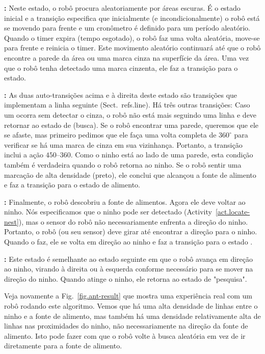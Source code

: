 \noindent\textbf{:} Neste estado, o robô procura aleatoriamente por áreas escuras. É o estado inicial e a transição  especifica que inicialmente (e incondicionalmente) o robô está se movendo para frente e um cronômetro é definido para um período aleatório. Quando o timer expira (tempo esgotado), o robô faz uma volta aleatória, move-se para frente e reinicia o timer. Este movimento aleatório continuará até que o robô encontre a parede da área ou uma marca cinza na superfície da área.  Uma vez que o robô tenha detectado uma marca cinzenta, ele faz a transição para o estado.

\smallskip

\noindent\textbf{:} As duas auto-transições acima e à direita deste estado são transições que implementam a linha seguinte (Sect.~ref{s.line}). Há três outras transições: Caso um  ocorra sem detectar o cinza, o robô não está mais seguindo uma linha e deve retornar ao estado de \p (busca). Se o robô encontrar uma parede, queremos que ele se afaste, mas primeiro pedimos que ele faça uma volta completa de $360^\circ$ para verificar se há uma marca de cinza em sua vizinhança. Portanto, a transição inclui a ação $450$--$360$. Como o ninho está ao lado de uma parede, esta condição também é verdadeira quando o robô retorna ao ninho. Se o robô sentir uma marcação de alta densidade (preto), ele conclui que alcançou a fonte de alimento e faz a transição para o estado de alimento.

\smallskip

\noindent\textbf{:} Finalmente, o robô descobriu a fonte de alimentos. Agora ele deve voltar ao ninho. Nós especificamos que o ninho pode ser detectado (Activity~\ref{act.locate-nest}), mas o sensor do robô não necessariamente enfrenta a direção do ninho. Portanto, o robô (ou seu sensor) deve girar até encontrar a direção para o ninho. Quando o faz, ele se volta em direção ao ninho e faz a transição para o estado .

\smallskip

\noindent\textbf{:} Este estado é semelhante ao estado {seguinte} em que o robô avança em direção ao ninho, virando à direita ou à esquerda conforme necessário para se mover na direção do ninho. Quando atinge o ninho, ele retorna ao estado de "pesquisa".

\smallskip

Veja novamente a Fig.~\ref{fig.ant-result} que mostra uma experiência real com um robô rodando este algoritmo. Vemos que há uma alta densidade de linhas entre o ninho e a fonte de alimento, mas também há uma densidade relativamente alta de linhas nas proximidades do ninho, não necessariamente na direção da fonte de alimento. Isto pode fazer com que o robô volte à busca aleatória em vez de ir diretamente para a fonte de alimento.

